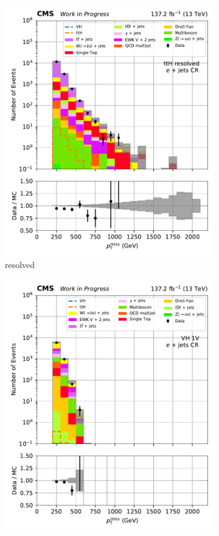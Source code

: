 \begin{figure}[htbp]
\begin{subfigure}[b]{0.24\textwidth}
        \includegraphics[width=\textwidth]{figures/region_plots/2016to18/region_3/ttH_resolved.pdf}
        \caption{\ttH resolved}
    \end{subfigure}
    \begin{subfigure}[b]{0.24\textwidth}
        \includegraphics[width=\textwidth]{figures/region_plots/2016to18/region_3/VH_1V.pdf}

\end{subfigure}
\end{figure}
